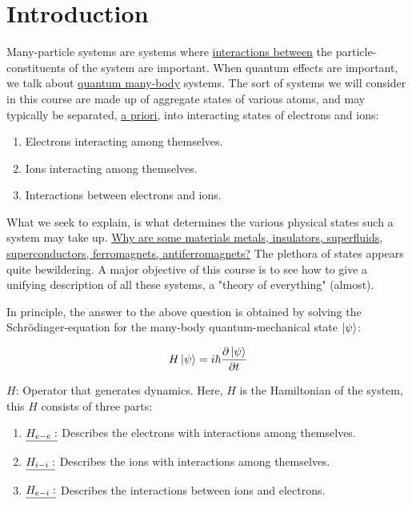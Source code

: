 \section{Introduction} 

\noindent Many-particle systems are systems where \uline{interactions between} the particle-constituents of the system are important. When quantum effects are important, we talk about \uline{quantum many-body} systems. The sort of systems we will consider in this course are made up of aggregate states of various atoms, and may typically be separated, \uline{a priori}, into interacting states of electrons and ions:

\begin{enumerate}
	\item
		Electrons interacting among themselves.
	\item 
		Ions interacting among themselves.
	\item
		Interactions between electrons and ions.
\end{enumerate}

\noindent What we seek to explain, is what determines the various physical states such a system may take up. \uline{Why are some materials metals, insulators, superfluids, superconductors, ferromagnets, antiferromagnets?} The plethora of states appears quite bewildering. A major objective of this course is to see how to give a unifying description of all these systems, a "theory of everything" (almost).

In principle, the answer to the above question is obtained by solving the Schrödinger-equation for the many-body quantum-mechanical state $\ket{\psi}$:

\begin{equation}
	H \ket{\psi} = i \hbar \frac{\partial \ket{\psi}}{\partial t}
\end{equation}

\noindent $H$: Operator that generates dynamics. Here, $H$ is the Hamiltonian of the system, this $H$ consists of three parts:

\begin{enumerate}
	\item
		$\uline{H_{e-e}:}$ Describes the electrons with interactions among themselves.
	\item
		$\uline{H_{i-i}:}$ Describes the ions with interactions among themselves.
	\item
		$\uline{H_{e-i}:}$ Describes the interactions between ions and electrons.
\end{enumerate}

